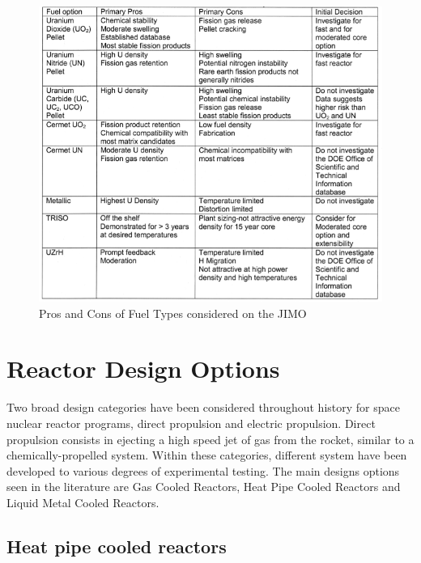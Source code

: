 \documentclass{article}
\begin{document}
\begin{figure}[]
	\centering
	\includegraphics[height=0.45\textheight]{fig/appU}
	\caption[Pros and Cons of Fuel Types considered on the JIMO]{Pros and Cons of Fuel Types considered on the JIMO~\cite{wollman2006prometheus}}
	\label{appU}
\end{figure}













\section{Reactor Design Options}

Two broad design categories have been considered throughout history for space nuclear reactor programs, direct propulsion and electric propulsion. Direct propulsion consists in ejecting a high speed jet of gas from the rocket, similar to a chemically-propelled system. Within these categories, different system have been developed to various degrees of experimental testing. The main designs options seen in the literature are Gas Cooled Reactors, Heat Pipe Cooled Reactors and Liquid Metal Cooled Reactors.

\subsection{Heat pipe cooled reactors}
\end{document}

